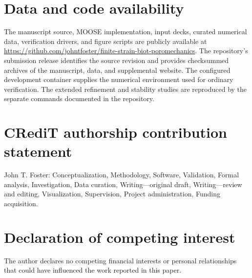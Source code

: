 \section*{Data and code availability}

The manuscript source, MOOSE implementation, input decks, curated numerical
data, verification drivers, and figure scripts are publicly available at
\url{https://github.com/johntfoster/finite-strain-biot-poromechanics}.
The repository's submission release identifies the source revision and
provides checksummed archives of the manuscript, data, and supplemental
website. The configured development container supplies the numerical
environment used for ordinary verification. The extended refinement and
stability studies are reproduced by the separate commands documented in the
repository.

\section*{CRediT authorship contribution statement}

John T. Foster: Conceptualization, Methodology, Software, Validation, Formal
analysis, Investigation, Data curation, Writing---original draft,
Writing---review and editing, Visualization, Supervision, Project
administration, Funding acquisition.

\section*{Declaration of competing interest}

The author declares no competing financial interests or personal relationships
that could have influenced the work reported in this paper.
